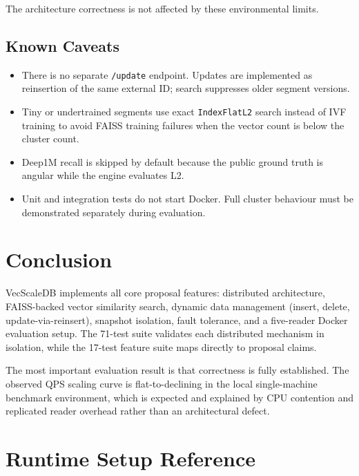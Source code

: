 \documentclass[11pt,a4paper]{article}
\begin{document}
The architecture correctness is not affected by these environmental limits.

\subsection{Known Caveats}

\begin{itemize}[noitemsep,topsep=4pt]
  \item There is no separate \texttt{/update} endpoint. Updates are
    implemented as reinsertion of the same external ID; search suppresses
    older segment versions.
  \item Tiny or undertrained segments use exact \texttt{IndexFlatL2} search
    instead of IVF training to avoid FAISS training failures when the
    vector count is below the cluster count.
  \item Deep1M recall is skipped by default because the public ground truth
    is angular while the engine evaluates L2.
  \item Unit and integration tests do not start Docker. Full cluster
    behaviour must be demonstrated separately during evaluation.
\end{itemize}

\section{Conclusion}

VecScaleDB implements all core proposal features: distributed architecture,
FAISS-backed vector similarity search, dynamic data management (insert, delete,
update-via-reinsert), snapshot isolation, fault tolerance, and a five-reader
Docker evaluation setup. The 71-test suite validates each distributed mechanism
in isolation, while the 17-test feature suite maps directly to proposal claims.

The most important evaluation result is that correctness is fully established.
The observed QPS scaling curve is flat-to-declining in the local single-machine
benchmark environment, which is expected and explained by CPU contention and
replicated reader overhead rather than an architectural defect.

\appendix
\section{Runtime Setup Reference}
\end{document}
